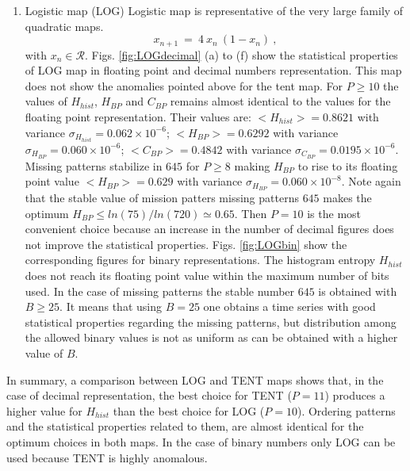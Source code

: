 \begin{enumerate}
%
\item Logistic map (LOG)
Logistic map is representative of the very large family of quadratic maps. 
\begin{equation}\label{eq:logimap}
 x_{n+1}~=~4~x_n~(1-x_n) \ ,
\end{equation}
with $x_n\in\mathcal{R}$.
%
Figs. \ref{fig:LOGdecimal} (a) to (f) show the statistical properties of LOG map in floating point and decimal numbers representation. This map does not show the anomalies pointed above for the tent map. For $P\geq 10$ the values of $H_{hist}$, $H_{BP}$ and $C_{BP}$ remains almost identical to the values for the floating point representation. Their values are: $<H_{hist}>=0.8621$ with variance $\sigma_{H_{hist}}=0.062 \times 10^{-6}$; $<H_{BP}>=0.6292$ with variance $\sigma_{H_{BP}}=0.060 \times 10^{-6}$; $<C_{BP}>=0.4842$ with variance $\sigma_{C_{BP}}=0.0195 \times 10^{-6}$. Missing patterns stabilize in $645$ for $P \geq 8$ making $H_{BP}$ to rise to its floating point value $<H_{BP}>=0.629$ with variance $\sigma_{H_{BP}}=0.060 \times 10^{-8}$. Note again that the stable value of mission patters missing patterns $645$ makes the optimum $H_{BP} \leq ln(75)/ln(720) \simeq 0.65$. Then $P=10$ is the most convenient choice because an increase in the number of decimal figures does not improve the statistical properties. 
Figs. \ref{fig:LOGbin} show the corresponding figures for binary representations. The histogram entropy $H_{hist}$ does not reach its floating point value within the maximum number of bits used. In the case of missing patterns the stable number $645$ is obtained with $B \geq 25$. It means that using $B=25$ one obtains a time series with good statistical properties regarding the missing patterns, but distribution among the allowed binary values is not as uniform as can be obtained with a higher value of $B$. 
\end{enumerate}

In summary, a comparison between LOG and TENT maps shows that, in the case of decimal representation, the best choice for TENT ($P=11$) produces a higher value for $H_{hist}$ than the best choice for LOG ($P=10$). Ordering patterns and the statistical properties related to them, are almost identical for the optimum choices in both maps. In the case of binary numbers  only LOG  can be used because TENT is highly anomalous. 

